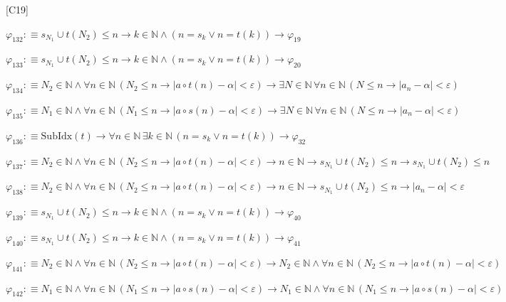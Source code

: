 \begin{fullproof}{[C19]}
\begin{abbrevlist}
\item $\varphi_{132} :\equiv s_{N_{1}} \cup t(N_{2}) \leq n \to k \in \mathbb{N} \land (n = s_{k} \lor n = t(k)) \to \varphi_{19}$
\item $\varphi_{133} :\equiv s_{N_{1}} \cup t(N_{2}) \leq n \to k \in \mathbb{N} \land (n = s_{k} \lor n = t(k)) \to \varphi_{20}$
\item $\varphi_{134} :\equiv N_{2} \in \mathbb{N} \land \forall n \in \mathbb{N}\,(N_{2} \leq n \to \lvert a \circ t(n) - \alpha \rvert < \varepsilon) \to \exists N \in \mathbb{N}\,\forall n \in \mathbb{N}\,(N \leq n \to \lvert a_{n} - \alpha \rvert < \varepsilon)$
\item $\varphi_{135} :\equiv N_{1} \in \mathbb{N} \land \forall n \in \mathbb{N}\,(N_{1} \leq n \to \lvert a \circ s(n) - \alpha \rvert < \varepsilon) \to \exists N \in \mathbb{N}\,\forall n \in \mathbb{N}\,(N \leq n \to \lvert a_{n} - \alpha \rvert < \varepsilon)$
\item $\varphi_{136} :\equiv \mathrm{SubIdx}(t) \to \forall n \in \mathbb{N}\,\exists k \in \mathbb{N}\,(n = s_{k} \lor n = t(k)) \to \varphi_{32}$
\item $\varphi_{137} :\equiv N_{2} \in \mathbb{N} \land \forall n \in \mathbb{N}\,(N_{2} \leq n \to \lvert a \circ t(n) - \alpha \rvert < \varepsilon) \to n \in \mathbb{N} \to s_{N_{1}} \cup t(N_{2}) \leq n \to s_{N_{1}} \cup t(N_{2}) \leq n$
\item $\varphi_{138} :\equiv N_{2} \in \mathbb{N} \land \forall n \in \mathbb{N}\,(N_{2} \leq n \to \lvert a \circ t(n) - \alpha \rvert < \varepsilon) \to n \in \mathbb{N} \to s_{N_{1}} \cup t(N_{2}) \leq n \to \lvert a_{n} - \alpha \rvert < \varepsilon$
\item $\varphi_{139} :\equiv s_{N_{1}} \cup t(N_{2}) \leq n \to k \in \mathbb{N} \land (n = s_{k} \lor n = t(k)) \to \varphi_{40}$
\item $\varphi_{140} :\equiv s_{N_{1}} \cup t(N_{2}) \leq n \to k \in \mathbb{N} \land (n = s_{k} \lor n = t(k)) \to \varphi_{41}$
\item $\varphi_{141} :\equiv N_{2} \in \mathbb{N} \land \forall n \in \mathbb{N}\,(N_{2} \leq n \to \lvert a \circ t(n) - \alpha \rvert < \varepsilon) \to N_{2} \in \mathbb{N} \land \forall n \in \mathbb{N}\,(N_{2} \leq n \to \lvert a \circ t(n) - \alpha \rvert < \varepsilon)$
\item $\varphi_{142} :\equiv N_{1} \in \mathbb{N} \land \forall n \in \mathbb{N}\,(N_{1} \leq n \to \lvert a \circ s(n) - \alpha \rvert < \varepsilon) \to N_{1} \in \mathbb{N} \land \forall n \in \mathbb{N}\,(N_{1} \leq n \to \lvert a \circ s(n) - \alpha \rvert < \varepsilon)$

\end{abbrevlist}
\end{fullproof}
